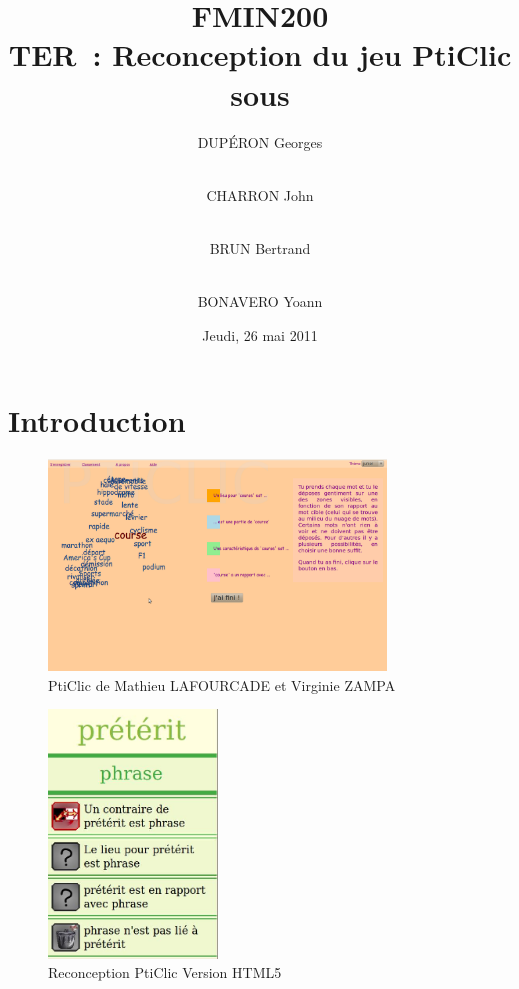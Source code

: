 \documentclass{beamer}
\title{FMIN200 \\ TER~: Reconception du jeu PtiClic sous \android{}}
\author{DUPÉRON Georges \and\\ CHARRON John \and\\ BRUN Bertrand \and\\ BONAVERO Yoann}
\institute{Université Montpellier II, Département informatique}
\date{Jeudi, 26 mai 2011}
\begin{document}
\begin{frame}
  \titlepage
\end{frame}

\section{Introduction}

\begin{frame}  
\begin{figure}[h!]
  \centering
      \includegraphics[width=0.8\textwidth]{img/PtiClicJeu.png}
\caption{PtiClic de Mathieu LAFOURCADE et Virginie ZAMPA}
\end{figure}
\end{frame}

\begin{frame}  
\begin{figure}[h!]
  \centering
      \includegraphics[width=0.4\textwidth]{img/preterit01.jpg}
\caption{Reconception PtiClic Version HTML5}
\end{figure}
\end{frame}
\end{document}
